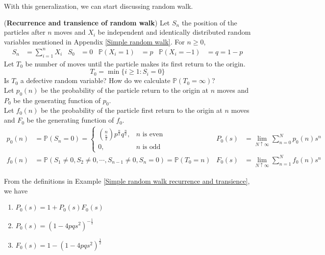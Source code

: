\documentclass{huhtakm-template-book}
\newcommand{\prob}{\mathbb{P}}
\begin{document}
\newpage
With this generalization, we can start discussing random walk.
\begin{eg}(\textbf{Recurrence and transience of random walk})
	\label{Simple random walk recurrence and transience}
	Let $S_{n}$ the position of the particles after $n$ moves and $X_{i}$ be independent and identically distributed random variables mentioned in Appendix \ref{Simple random walk}. For $n\geq 0$,
	\begin{align*}
		S_{n}&=\sum_{i=1}^{n}X_{i} & S_{0}&=0 & \prob(X_{i}=1)&=p & \prob(X_{i}=-1)&=q=1-p
	\end{align*}
	Let $T_{0}$ be number of moves until the particle makes its first return to the origin.
	\begin{equation*}
		T_{0}=\min\{i\geq 1:S_{i}=0\}
	\end{equation*}
	Is $T_{0}$ a defective random variable? How do we calculate $\prob(T_{0}=\infty)$?\\
	Let $p_{0}(n)$ be the probability of the particle return to the origin at $n$ moves and $P_{0}$ be the generating function of $p_{0}$.\\
	Let $f_{0}(n)$ be the probability of the particle first return to the origin at $n$ moves and $F_{0}$ be the generating function of $f_{0}$.
	\begin{align*}
		p_{0}(n)&=\prob(S_{n}=0)=\begin{cases}
			\binom{n}{\frac{n}{2}}p^{\frac{n}{2}}q^{\frac{n}{2}}, &n\text{ is even}\\
			0, &n\text{ is odd}
		\end{cases} & P_{0}(s)&=\lim_{N\uparrow\infty}\sum_{n=0}^{N}p_{0}(n)s^{n}\\
		f_{0}(n)&=\prob(S_{1}\neq 0,S_{2}\neq 0,\cdots,S_{n-1}\neq 0,S_{n}=0)=\prob(T_{0}=n) & F_{0}(s)&=\lim_{N\uparrow\infty}\sum_{n=1}^{N}f_{0}(n)s^{n}
	\end{align*}
\end{eg}
\begin{thm}
	\label{Chapter 5 Theorem Simple random walk particle return generating function}
	From the definitions in Example \ref{Simple random walk recurrence and transience}, we have
	\begin{enumerate}
		\item $P_{0}(s)=1+P_{0}(s)F_{0}(s)$
		\item $P_{0}(s)=(1-4pqs^{2})^{-\frac{1}{2}}$
		\item $F_{0}(s)=1-(1-4pqs^{2})^{\frac{1}{2}}$
	\end{enumerate}
\end{thm}
\end{document}
